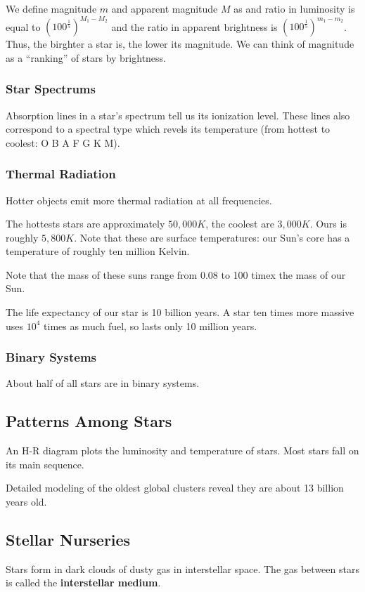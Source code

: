 \documentclass[12pt]{article}
\begin{document}
We define magnitude $m$ and apparent magnitude $M$ as and ratio in luminosity is equal to $(100^\frac{1}{5})^{M_1 - M_2}$ and the ratio in apparent brightness is $(100^\frac{1}{5})^{m_1 - m_2}$. Thus, the birghter a star is, the lower its magnitude. We can think of magnitude as a ``ranking'' of stars by brightness.

\subsubsection{Star Spectrums}
Absorption lines in a star's spectrum tell us its ionization level. These lines also correspond to a spectral type which revels its temperature (from hottest to coolest: O B A F G K M).

\subsubsection{Thermal Radiation}
Hotter objects emit more thermal radiation at all frequencies.

The hottests stars are approximately $50,000K$, the coolest are $3,000K$. Ours is roughly $5,800K$. Note that these are surface temperatures: our Sun's core has a temperature of roughly ten million Kelvin.

Note that the mass of these suns range from 0.08 to 100 timex the mass of our Sun.

The life expectancy of our star is 10 billion years. A star ten times more massive uses $10^4$ times as much fuel, so lasts only 10 million years.

\subsubsection{Binary Systems}
About half of all stars are in binary systems.

\subsection{Patterns Among Stars}
An H-R diagram plots the luminosity and temperature of stars. Most stars fall on its main sequence.

Detailed modeling of the oldest global clusters reveal they are about 13 billion years old.

\subsection{Stellar Nurseries}
Stars form in dark clouds of dusty gas in interstellar space. The gas between stars is called the {\bf interstellar medium}.
\end{document}
